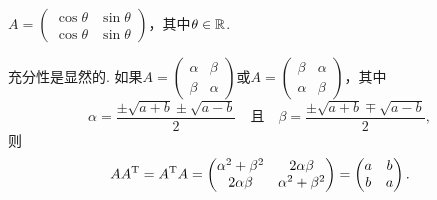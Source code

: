 \begin{solution}
  $A=\begin{pmatrix}
    \cos \theta & \sin \theta \\
    \cos \theta & \sin \theta
  \end{pmatrix}$，其中$\theta\in\mathbb R$.
\end{solution}

\setcounter{solution}{59}

\begin{solution}
  充分性是显然的. 如果$A=\begin{pmatrix}
    \alpha & \beta \\
    \beta & \alpha
  \end{pmatrix}$或$A=\begin{pmatrix}
    \beta & \alpha \\
    \alpha & \beta
  \end{pmatrix}$，其中
  \[
    \alpha = \frac{\pm\sqrt{a+b}\pm\sqrt{a-b}}2\quad
    \text{且} \quad
    \beta = \frac{\pm\sqrt{a+b}\mp\sqrt{a-b}}2,
  \]
  则
  \[
    AA^{\mathrm T} = A^{\mathrm T} A =
    \begin{pmatrix}
      \alpha^2 + \beta^2 & 2\alpha\beta \\
      2\alpha\beta & \alpha^2 + \beta^2
    \end{pmatrix} =
    \begin{pmatrix}
      a & b \\
      b & a
    \end{pmatrix}.
  \]


\end{solution}
